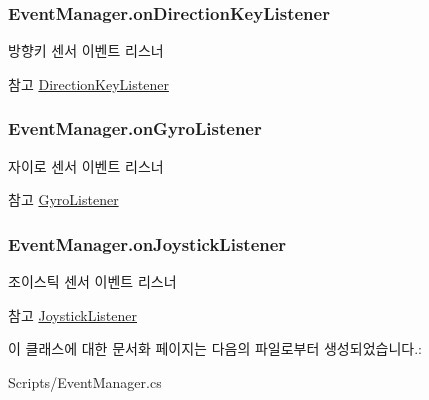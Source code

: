 \subsubsection[{on\+Direction\+Key\+Listener}]{ Event\+Manager.\+on\+Direction\+Key\+Listener}\label{class_event_manager_aabcdea295255f84519ce6c7ef7026b64}
방향키 센서 이벤트 리스너 \begin{DoxySeeAlso}{참고}
\hyperlink{class_event_manager_a3bcc7e1ecc58c1625fb107ce4fe6feaa}{Direction\+Key\+Listener} 
\end{DoxySeeAlso}
\hypertarget{class_event_manager_a31f1da96e98896421b0026df5ce01623}{}
\subsubsection[{on\+Gyro\+Listener}]{ Event\+Manager.\+on\+Gyro\+Listener}\label{class_event_manager_a31f1da96e98896421b0026df5ce01623}
자이로 센서 이벤트 리스너 \begin{DoxySeeAlso}{참고}
\hyperlink{class_event_manager_a4ed9f5be26f2015a5cc107257f02eff8}{Gyro\+Listener} 
\end{DoxySeeAlso}
\hypertarget{class_event_manager_ab148217093b03a8cd7c962a11195c83a}{}
\subsubsection[{on\+Joystick\+Listener}]{ Event\+Manager.\+on\+Joystick\+Listener}\label{class_event_manager_ab148217093b03a8cd7c962a11195c83a}
조이스틱 센서 이벤트 리스너 \begin{DoxySeeAlso}{참고}
\hyperlink{class_event_manager_ad470a4c2e411d814dd480043332f2a70}{Joystick\+Listener} 
\end{DoxySeeAlso}


이 클래스에 대한 문서화 페이지는 다음의 파일로부터 생성되었습니다.\+:\begin{DoxyCompactItemize}
\item 
Scripts/Event\+Manager.\+cs\end{DoxyCompactItemize}
